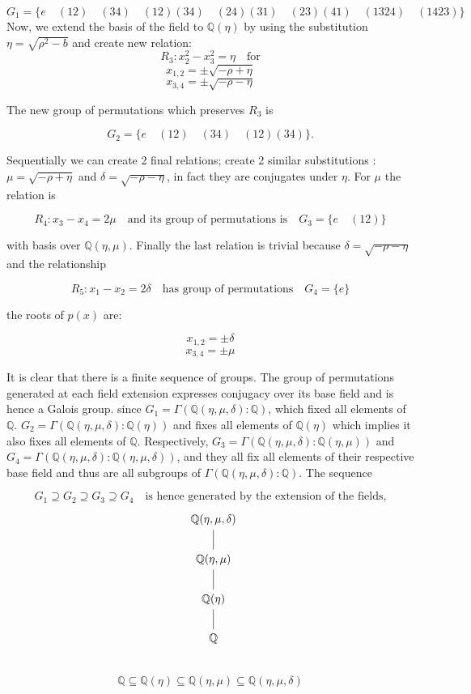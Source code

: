 \documentclass{article}
\begin{document}
$$ G_1 = \lbrace e \quad (12) \quad (34) \quad (12)(34) \quad (24)(31) \quad (23)(41) \quad (1324) \quad (1423) \rbrace$$
Now, we extend the basis of the field to $\mathbb{Q}(\eta)$ by using the substitution $\eta = \sqrt{\rho^2 -b}$ and create new relation:
$$R_3 : x_2^2-x_3^2=\eta \quad \textrm{for}$$
$$x_{1,2} = \pm \sqrt{-\rho + \eta}$$
$$x_{3,4} = \pm \sqrt{-\rho - \eta}$$

The new group of permutations which preserves $R_3$ is

$$G_2 = \lbrace e \quad (12) \quad (34) \quad (12)(34) \rbrace.$$

Sequentially we can create 2 final relations; create 2 similar substitutions : $\mu = \sqrt{-\rho + \eta}$ and $\delta = \sqrt{-\rho - \eta}$, in fact they are conjugates under $\eta$. For $\mu$ the relation is

$$R_4 : x_3 - x_4 = 2\mu \quad \textrm{and its group of permutations is} \quad G_3 = \lbrace e \quad (12) \rbrace$$

with basis over $\mathbb{Q}(\eta,\mu)$. Finally the last relation is trivial because $\delta = \sqrt{-\rho - \eta}$ and the relationship

$$ R_5 : x_1 - x_2 =2\delta \quad \textrm{has group of permutations} \quad G_4 = \lbrace e \rbrace$$

the roots of $p(x)$ are:

$$x_{1,2} = \pm \delta$$
$$x_{3,4} = \pm \mu$$

It is clear that there is a finite sequence of groups. The group of permutations generated at each field extension expresses conjugacy over its base field and is hence a Galois group. since $G_1 = \Gamma(\mathbb{Q}(\eta,\mu,\delta) : \mathbb{Q})$, which fixed all elements of $\mathbb{Q}$. $G_2 = \Gamma(\mathbb{Q}(\eta,\mu,\delta) : \mathbb{Q}(\eta))$ and fixes all elements of $\mathbb{Q}(\eta)$ which implies it also fixes all elements of $\mathbb{Q}$. Respectively, $G_3 = \Gamma(\mathbb{Q}(\eta,\mu,\delta): \mathbb{Q}(\eta,\mu))$ and $G_4 = \Gamma(\mathbb{Q}(\eta,\mu,\delta): \mathbb{Q}(\eta,\mu,\delta))$, and they all fix all elements of their respective base field and thus are all subgroups of $\Gamma(\mathbb{Q}(\eta,\mu,\delta): \mathbb{Q})$. The sequence

$$G_1 \supseteq G_2 \supseteq G_3 \supseteq G_4 \quad \textrm{is hence generated by the extension of the fields,}$$
$$\begin{tikzcd}[row sep=small, column sep=tiny]
    & \mathbb{Q}(\eta,\mu,\delta) \arrow[dash]{dd} \\
    & \\
    & \mathbb{Q}(\eta,\mu) \arrow[dash]{dd} \\
    & \\
    & \mathbb{Q}(\eta) \arrow[dash]{dd} \\
    & \\
    & \mathbb{Q}  \\
    & \\
\end{tikzcd}$$
$$\mathbb{Q}\subseteq\mathbb{Q}(\eta)\subseteq\mathbb{Q}(\eta,\mu)\subseteq\mathbb{Q}(\eta,\mu,\delta)$$
\end{document}
